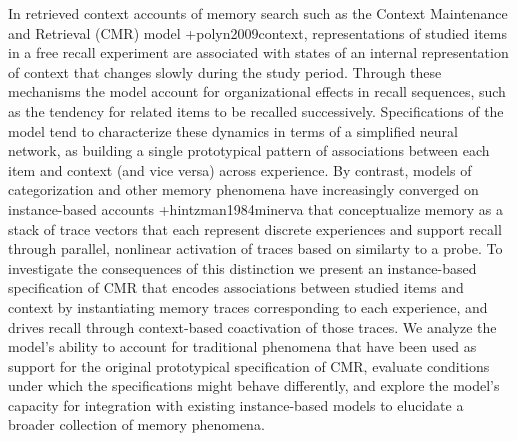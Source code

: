In retrieved context accounts of memory search such as the Context Maintenance and Retrieval (CMR) model +{}{}{polyn2009context}, representations of studied items in a free recall experiment are associated with states of an internal representation of context that changes slowly during the study period. Through these mechanisms the model account for organizational effects in recall sequences, such as the tendency for related items to be recalled successively. Specifications of the model tend to characterize these dynamics in terms of a simplified neural network, as building a single prototypical pattern of associations between each item and context (and vice versa) across experience. By contrast, models of categorization and other memory phenomena have increasingly converged on instance-based accounts +{}{}{hintzman1984minerva} that conceptualize memory as a stack of trace vectors that each represent discrete experiences and support recall through parallel, nonlinear activation of traces based on similarty to a probe. To investigate the consequences of this distinction we present an instance-based specification of CMR that encodes associations between studied items and context by instantiating memory traces corresponding to each experience, and drives recall through context-based coactivation of those traces. We analyze the model's ability to account for traditional phenomena that have been used as support for the original prototypical specification of CMR, evaluate conditions under which the specifications might behave differently, and explore the model's capacity for integration with existing instance-based models to elucidate a broader collection of memory phenomena.\markdownRendererInterblockSeparator
{}\relax
